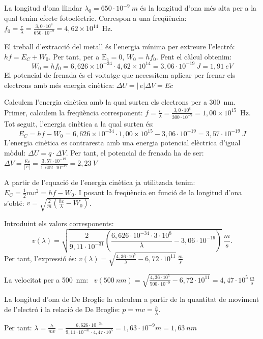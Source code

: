 \begin{solapartat}
 La longitud d'ona llindar $\lambda_0 = 650\cdot 10^{-9}\ m$ és la longitud d'ona més alta per a la qual tenim efecte fotoelèctric. Correspon a una freqüència: $f_0 = \frac{c}{\lambda} = \frac{3,0\cdot 10^{8}}{650\cdot 10^{-9}} = 4,62\times 10^{14}$~Hz.

 El treball d'extracció del metall és l'energia mínima per extreure l'electró: $hf = E_C + W_0$. Per tant, per a $\mathrm{E_c}=0$, $W_0 = hf_0$. Fent el càlcul obtenim:
\[ W_0 = hf_0 = 6,626\times 10^{-34}\cdot 4,62\times 10^{14} = 3,06\cdot 10^{-19}\ J = 1,91\ eV \]
 El potencial de frenada és el voltatge que necessitem aplicar per frenar els electrons amb més energia cinètica: $\Delta U = |\,e|\Delta V = Ec$

 Calculem l'energia cinètica amb la qual surten els electrons per a 300~nm. Primer, calculem la freqüència corresponent: $f = \frac{c}{\lambda} = \frac{3,0\cdot 10^{8}}{300\cdot 10^{-9}} = 1,00\times 10^{15}$~Hz. Tot seguit, l'energia cinètica a la qual surten és:
\[ E_C = hf - W_0 = 6,626\times 10^{-34}\cdot 1,00\times 10^{15} - 3,06\cdot 10^{-19} = 3,57\cdot 10^{-19}\ J \]
 L'energia cinètica es contraresta amb una energia potencial elèctrica d'igual mòdul: $\Delta U = q\cdot\Delta V$. Per tant, el potencial de frenada ha de ser: $\Delta V = \frac{Ec}{|\,e|} = \frac{3,57\cdot 10^{-19}}{1,602\cdot 10^{-19}} = 2,23\ V$
\end{solapartat}

\begin{solapartat}
 A partir de l'equació de l'energia cinètica ja utilitzada tenim: $E_C = \frac{1}{2}mv^2 = hf - W_0$. I posant la freqüència en funció de la longitud d'ona s'obté: $v = \sqrt{\frac{2}{m}\left(\frac{hc}{\lambda} - W_0\right)}$.

Introduint els valors corresponents:
\[ v(\lambda) = \sqrt{\frac{2}{9,11\cdot 10^{-31}}\left(\frac{6,626\cdot 10^{-34}\cdot 3\cdot 10^{8}}{\lambda} - 3,06\cdot 10^{-19}\right)}\ \frac{m}{s}. \]
Per tant, l'expressió és: $v(\lambda) = \sqrt{\frac{4,36\cdot 10^{5}}{\lambda} - 6,72\cdot 10^{11}}\ \frac{m}{s}$

 La velocitat per a 500~nm: \ $v(500\ nm) = \sqrt{\frac{4,36\cdot 10^{5}}{500\cdot 10^{-9}} - 6,72\cdot 10^{11}} = 4,47\cdot 10^{5}\,\frac{m}{s}$

 La longitud d'ona de De Broglie la calculem a partir de la quantitat de moviment de l'electró i la relació de De Broglie: $p = mv = \frac{h}{\lambda}$.

Per tant: $\lambda = \frac{h}{mv} = \frac{6,626\cdot 10^{-34}}{9,11\cdot 10^{-31}\cdot 4,47\cdot 10^{5}} = 1,63\cdot 10^{-9} m = 1,63\ nm$
\end{solapartat}
